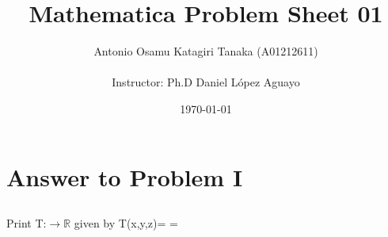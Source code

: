 \documentclass[11pt,a4paper]{article}
\title
{
    Mathematica Problem Sheet 01
}
\author
{    
    Antonio Osamu Katagiri Tanaka (A01212611) \\
    \\
    Instructor: Ph.D Daniel L{\' o}pez Aguayo
}
\date{\today}
\providecommand{\keywords}[1]
{
    \\
    \\
    \small
    \textbf{\textit{Keywords:}} #1
}
\begin{document}
\setlength\parindent{0pt} %


\maketitle


\clearpage








\section{Answer to Problem I}\label{sec:P01}

\subsection{}
\begin{mmaCell}{Print}
T:\(\pmb{\rightarrow}\)\(\pmb{\mathbb{R}}\) given by T(x,y,z)=
=
\end{mmaCell}
\end{document}
